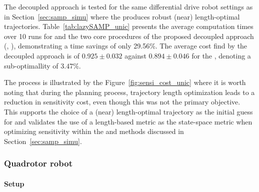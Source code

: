 The decoupled approach is tested for the same differential drive robot settings as in Section~\ref{sec:samp_simu} where the  produces robust (near) length-optimal trajectories.
Table~\ref{tab:lazySAMP_unic} presents the average computation times over 10 runs for  and the two core procedures of the proposed decoupled approach (, ), demonstrating a time savings of only 29.56\%.
The average cost find by the decoupled approach is of $0.925 \pm 0.032$ against $0.894 \pm 0.046$ for the , denoting a sub-optimallity of $3.47\%$.

The process is illustrated by the Figure~\ref{fig:sensi_cost_unic} where it is worth noting that during the  planning process, trajectory length optimization leads to a reduction in sensitivity cost, even though this was not the primary objective. 
This supports the choice of a (near) length-optimal trajectory as the initial guess for  and validates the use of a length-based metric as the state-space metric when optimizing sensitivity within the  and  methods discussed in Section~\ref{sec:samp_simu}.

\subsubsection{Quadrotor robot}

\paragraph{Setup}

